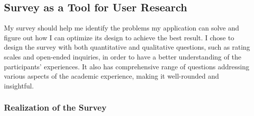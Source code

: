 \documentclass[11pt]{report}
\begin{document}
\subsection{Survey as a Tool for User Research}

My survey should help me identify the problems my application can solve and figure out how I can optimize its design to achieve the best result. I chose to design the survey with both quantitative and qualitative questions, such as rating scales and open-ended inquiries, in order to have a better understanding of the participants' experiences. It also has comprehensive range of questions addressing various aspects of the academic experience, making it well-rounded and insightful.

\subsubsection{Realization of the Survey}
\end{document}
